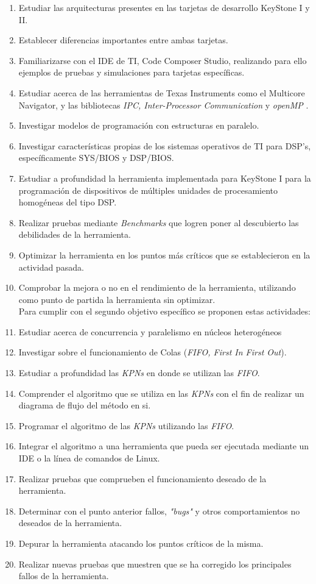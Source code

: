\begin{enumerate}
 \item Estudiar las arquitecturas presentes en las tarjetas de desarrollo KeyStone I y II.
 \item Establecer diferencias importantes entre ambas tarjetas.
 \item Familiarizarse con el IDE de TI, Code Composer Studio, realizando para ello ejemplos de pruebas
 y simulaciones para tarjetas específicas.
 \item Estudiar acerca de las herramientas de Texas Instruments como el Multicore Navigator, y las
 bibliotecas \textit{IPC, Inter-Processor Communication} y \textit{openMP} .
 \item Investigar modelos de programación con estructuras en paralelo.
 \item Investigar características propias de los sistemas operativos de TI para DSP's, específicamente
 SYS/BIOS y DSP/BIOS.
 \item Estudiar a profundidad la herramienta implementada para KeyStone I para la programación
 de dispositivos de múltiples unidades de procesamiento homogéneas del tipo DSP.
 \item Realizar pruebas mediante \textit{Benchmarks} que logren poner al descubierto las debilidades
 de la herramienta.
 \item Optimizar la herramienta en los puntos más críticos que se establecieron en la actividad pasada.
 \item Comprobar la mejora o no en el rendimiento de la herramienta, utilizando como punto de partida
 la herramienta sin optimizar.\\
 
 Para cumplir con el segundo objetivo específico se proponen estas actividades: \\
 
 \item Estudiar acerca de concurrencia y paralelismo en núcleos heterogéneos
 \item Investigar sobre el funcionamiento de Colas (\textit{FIFO, First In First Out}).
 \item Estudiar a profundidad las \textit{KPNs} en donde se utilizan las \textit{FIFO}.
 \item Comprender el algoritmo que se utiliza en las \textit{KPNs} con el fin de realizar un diagrama
 de flujo del método en si.
 \item Programar el algoritmo de las \textit{KPNs} utilizando las \textit{FIFO}.
 \item Integrar el algoritmo a una herramienta que pueda ser ejecutada mediante un IDE o la línea de
 comandos de Linux.
 \item Realizar pruebas que comprueben el funcionamiento deseado de la herramienta.
 \item Determinar con el punto anterior fallos, \textit{"bugs"} y otros comportamientos no deseados 
 de la herramienta.
 \item Depurar la herramienta atacando los puntos críticos de la misma.
 \item Realizar nuevas pruebas que muestren que se ha corregido los principales fallos de la herramienta.\\
 

\end{enumerate}
